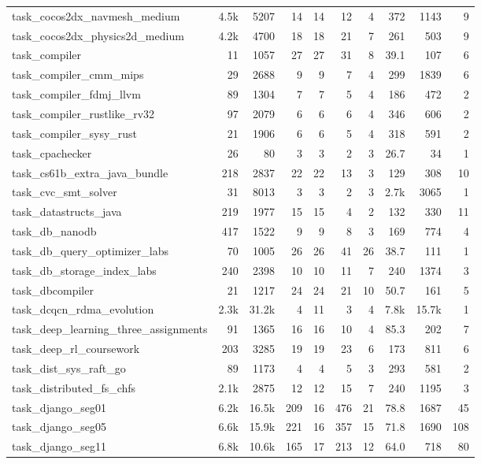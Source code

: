 \begin{table}[!htbp]
{\begin{tabular}{@{}lrr|r|rrr|rrr@{}}
task\_cocos2dx\_navmesh\_medium & 4.5k & 5207 & 14 & 14 & 12 & 4 & 372 & 1143 & 9 \\
task\_cocos2dx\_physics2d\_medium & 4.2k & 4700 & 18 & 18 & 21 & 7 & 261 & 503 & 9 \\
task\_compiler & 11 & 1057 & 27 & 27 & 31 & 8 & 39.1 & 107 & 6 \\
task\_compiler\_cmm\_mips & 29 & 2688 & 9 & 9 & 7 & 4 & 299 & 1839 & 6 \\
task\_compiler\_fdmj\_llvm & 89 & 1304 & 7 & 7 & 5 & 4 & 186 & 472 & 2 \\
task\_compiler\_rustlike\_rv32 & 97 & 2079 & 6 & 6 & 6 & 4 & 346 & 606 & 2 \\
task\_compiler\_sysy\_rust & 21 & 1906 & 6 & 6 & 5 & 4 & 318 & 591 & 2 \\
task\_cpachecker & 26 & 80 & 3 & 3 & 2 & 3 & 26.7 & 34 & 1 \\
task\_cs61b\_extra\_java\_bundle & 218 & 2837 & 22 & 22 & 13 & 3 & 129 & 308 & 10 \\
task\_cvc\_smt\_solver & 31 & 8013 & 3 & 3 & 2 & 3 & 2.7k & 3065 & 1 \\
task\_datastructs\_java & 219 & 1977 & 15 & 15 & 4 & 2 & 132 & 330 & 11 \\
task\_db\_nanodb & 417 & 1522 & 9 & 9 & 8 & 3 & 169 & 774 & 4 \\
task\_db\_query\_optimizer\_labs & 70 & 1005 & 26 & 26 & 41 & 26 & 38.7 & 111 & 1 \\
task\_db\_storage\_index\_labs & 240 & 2398 & 10 & 10 & 11 & 7 & 240 & 1374 & 3 \\
task\_dbcompiler & 21 & 1217 & 24 & 24 & 21 & 10 & 50.7 & 161 & 5 \\
task\_dcqcn\_rdma\_evolution & 2.3k & 31.2k & 4 & 11 & 3 & 4 & 7.8k & 15.7k & 1 \\
task\_deep\_learning\_three\_assignments & 91 & 1365 & 16 & 16 & 10 & 4 & 85.3 & 202 & 7 \\
task\_deep\_rl\_coursework & 203 & 3285 & 19 & 19 & 23 & 6 & 173 & 811 & 6 \\
task\_dist\_sys\_raft\_go & 89 & 1173 & 4 & 4 & 5 & 3 & 293 & 581 & 2 \\
task\_distributed\_fs\_chfs & 2.1k & 2875 & 12 & 12 & 15 & 7 & 240 & 1195 & 3 \\
task\_django\_seg01 & 6.2k & 16.5k & 209 & 16 & 476 & 21 & 78.8 & 1687 & 45 \\
task\_django\_seg05 & 6.6k & 15.9k & 221 & 16 & 357 & 15 & 71.8 & 1690 & 108 \\
task\_django\_seg11 & 6.8k & 10.6k & 165 & 17 & 213 & 12 & 64.0 & 718 & 80 \\

\end{tabular}}
\end{table}
